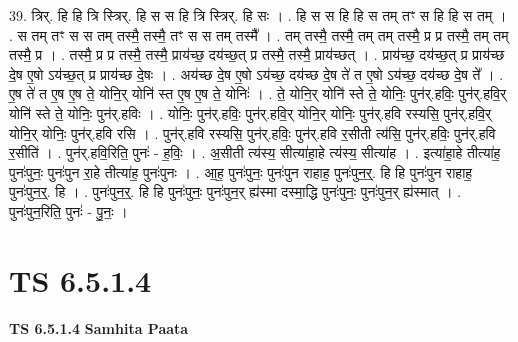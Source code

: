 \documentclass[17pt]{extarticle}
\begin{document}
39. त्रिर्. हि हि त्रि स्त्रिर्. हि स स हि त्रि स्त्रिर्. हि सः । . हि स स हि हि स तम् तꣳ स हि हि स तम् । . स तम् तꣳ स स तम् तस्मै॒ तस्मै॒ तꣳ स स तम् तस्मै᳚ । . तम् तस्मै॒ तस्मै॒ तम् तम् तस्मै॒ प्र प्र तस्मै॒ तम् तम् तस्मै॒ प्र । . तस्मै॒ प्र प्र तस्मै॒ तस्मै॒ प्राय॑च्छ॒ दय॑च्छ॒त् प्र तस्मै॒ तस्मै॒ प्राय॑च्छत् । . प्राय॑च्छ॒ दय॑च्छ॒त् प्र प्राय॑च्छ दे॒ष ए॒षो ऽय॑च्छ॒त् प्र प्राय॑च्छ दे॒षः । . अय॑च्छ दे॒ष ए॒षो ऽय॑च्छ॒ दय॑च्छ दे॒ष ते॑ त ए॒षो ऽय॑च्छ॒ दय॑च्छ दे॒ष ते᳚ । . ए॒ष ते॑ त ए॒ष ए॒ष ते॒ योनि॒र् योनि॑ स्त ए॒ष ए॒ष ते॒ योनिः॑ । . ते॒ योनि॒र् योनि॑ स्ते ते॒ योनिः॒ पुन॑र्.हविः॒ पुन॑र्.हवि॒र् योनि॑ स्ते ते॒ योनिः॒ पुन॑र्.हविः । . योनिः॒ पुन॑र्.हविः॒ पुन॑र्.हवि॒र् योनि॒र् योनिः॒ पुन॑र्.हवि रस्यसि॒ पुन॑र्.हवि॒र् योनि॒र् योनिः॒ पुन॑र्.हवि रसि । . पुन॑र्.हवि रस्यसि॒ पुन॑र्.हविः॒ पुन॑र्.हवि र॒सीती त्य॑सि॒ पुन॑र्.हविः॒ पुन॑र्.हवि र॒सीति॑ । . पुन॑र्.हवि॒रिति॒ पुनः॑ - ह॒विः॒ । . अ॒सीती त्य॑स्य॒ सीत्या॑हा॒हे त्य॑स्य॒ सीत्या॑ह । . इत्या॑हा॒हे तीत्या॑ह॒ पुनः॑पुनः॒ पुनः॑पुन रा॒हे तीत्या॑ह॒ पुनः॑पुनः । . आ॒ह॒ पुनः॑पुनः॒ पुनः॑पुन राहाह॒ पुनः॑पुन॒र्॒. हि हि पुनः॑पुन राहाह॒ पुनः॑पुन॒र्॒. हि । . पुनः॑पुन॒र्॒. हि हि पुनः॑पुनः॒ पुनः॑पुन॒र् ह्य॑स्मा दस्मा॒द्धि पुनः॑पुनः॒ पुनः॑पुन॒र् ह्य॑स्मात् । . पुनः॑पुन॒रिति॒ पुनः॑ - पु॒नः॒ । \newline
\pagebreak
{}

\section{ TS 6.5.1.4 }

\textbf{TS 6.5.1.4 } \newline
\textbf{Samhita Paata} \newline
\end{document}
